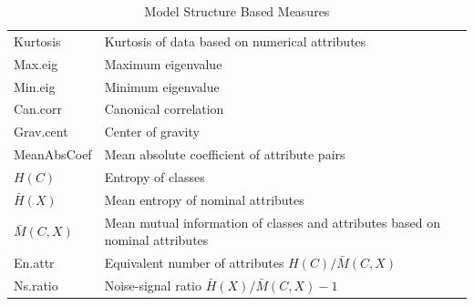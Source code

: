 \documentclass[prodmode,acmtkdd]{acmsmall}
\begin{document}
\begin{table}[!h]
\begin{minipage}{0.85\textwidth}
{\begin{tabular}{l|l}
        Kurtosis & Kurtosis of data based on numerical attributes \\
        Max.eig & Maximum eigenvalue\\
        Min.eig & Minimum eigenvalue\\
        Can.corr & Canonical correlation\\
        Grav.cent & Center of gravity\\
        MeanAbsCoef & Mean absolute coefficient of attribute pairs \\
        \hline
        \emph{$H(C)$} & Entropy of classes \\
        \emph{$\bar{H}(X)$} & Mean entropy of nominal attributes \\
        \emph{$\bar{M}(C,X)$} & Mean mutual information of classes and attributes based on nominal attributes\\
        En.attr &  Equivalent number of attributes \emph{$H(C)/\bar{M}(C,X)$}\\
        Ns.ratio & Noise-signal ratio \emph{$\bar{H}(X)/\bar{M}(C,X)-1$} \\
        \hline
        \end{tabular}
    }
    \end{minipage}
    \begin{minipage}{0.85\textwidth}
    \footnotesize
    \centering
    \renewcommand{\arraystretch}{0.9}
    \caption{Model Structure Based Measures}\label{tab:modelMetrics}
\end{minipage}
\end{table}
\end{document}
